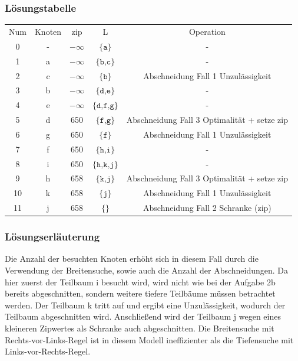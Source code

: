 \documentclass[a4paper,11pt]{article}
\begin{document}
\subsubsection*{Lösungstabelle}
    \begin{tabular}{ c c c c c }
        Num & Knoten & zip & L & Operation \\
        0 & - & $-\infty$ & $\texttt{\{a\}}$ & - \\
        1 & a & $-\infty$ & $\texttt{\{b,c\}}$ & - \\
        2 & c & $-\infty$ & $\texttt{\{b\}}$ & Abschneidung Fall 1 Unzulässigkeit \\
        3 & b & $-\infty$ & $\texttt{\{d,e\}}$ & - \\
        4 & e & $-\infty$ & $\texttt{\{d,f,g\}}$ & - \\
        5 & d & 650 & $\texttt{\{f,g\}}$ & Abschneidung Fall 3 Optimalität + setze zip \\
        6 & g & 650 & $\texttt{\{f\}}$ & Abschneidung Fall 1 Unzulässigkeit \\
        7 & f & 650 & $\texttt{\{h,i\}}$ & - \\
        8 & i & 650 & $\texttt{\{h,k,j\}}$ & - \\
        9 & h & 658 & $\texttt{\{k,j\}}$ &  Abschneidung Fall 3 Optimalität + setze zip \\
        10 & k & 658 & $\texttt{\{j\}}$ &  Abschneidung Fall 1 Unzulässigkeit \\
        11 & j & 658 & $\texttt{\{\}}$ &  Abschneidung Fall 2 Schranke (zip) \\
    \end{tabular}

\subsubsection*{Lösungserläuterung}
Die Anzahl der besuchten Knoten erhöht sich in diesem Fall durch die Verwendung der Breitensuche, sowie auch die Anzahl der Abschneidungen. Da hier zuerst der Teilbaum i besucht wird, wird nicht wie bei der Aufgabe 2b bereits abgeschnitten, sondern weitere tiefere Teilbäume müssen betrachtet werden. Der Teilbaum k tritt auf und ergibt eine Unzulässigkeit, wodurch der Teilbaum abgeschnitten wird. Anschließend wird der Teilbaum j wegen eines kleineren Zipwertes als Schranke auch abgeschnitten. Die Breitensuche mit Rechts-vor-Links-Regel ist in diesem Modell ineffizienter als die Tiefensuche mit Links-vor-Rechts-Regel.
\end{document}
